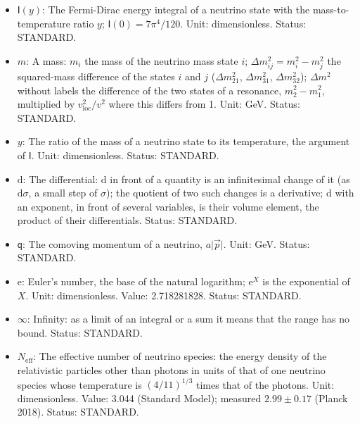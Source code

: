 \documentclass[
  10pt,
]{article}
\begin{document}
\begin{itemize}
  \(\mathsf{T}_\gamma^{(0)}\) its value today. Unit: GeV (or K). Value:
  2.7255 K today. Status: STANDARD.
\item
  \(\mathsf{I}(y)\): The Fermi-Dirac energy integral of a neutrino state
  with the mass-to-temperature ratio \(y\);
  \(\mathsf{I}(0) = 7\pi^4/120\). Unit: dimensionless. Status: STANDARD.
\item
  \(m\): A mass: \(m_i\) the mass of the neutrino mass state \(i\);
  \(\Delta m_{ij}^2 = m_i^2 - m_j^2\) the squared-mass difference of the
  states \(i\) and \(j\) (\(\Delta m_{21}^2\), \(\Delta m_{31}^2\),
  \(\Delta m_{32}^2\)); \(\Delta m^2\) without labels the difference of
  the two states of a resonance, \(m_2^2 - m_1^2\), multiplied by
  \(v_{\mathrm{loc}}^2/v^2\) where this differs from 1. Unit: GeV.
  Status: STANDARD.
\item
  \(y\): The ratio of the mass of a neutrino state to its temperature,
  the argument of \(\mathsf{I}\). Unit: dimensionless. Status: STANDARD.
\item
  \(\mathrm{d}\): The differential: \(\mathrm{d}\) in front of a
  quantity is an infinitesimal change of it (as \(\mathrm{d}\sigma\), a
  small step of \(\sigma\)); the quotient of two such changes is a
  derivative; \(\mathrm{d}\) with an exponent, in front of several
  variables, is their volume element, the product of their
  differentials. Status: STANDARD.
\item
  \(\mathsf{q}\): The comoving momentum of a neutrino,
  \(a\lvert\vec p\rvert\). Unit: GeV. Status: STANDARD.
\item
  \(\mathrm{e}\): Euler's number, the base of the natural logarithm;
  \(\mathrm{e}^{X}\) is the exponential of \(X\). Unit: dimensionless.
  Value: 2.718281828. Status: STANDARD.
\item
  \(\infty\): Infinity: as a limit of an integral or a sum it means that
  the range has no bound. Status: STANDARD.
\item
  \(N_{\mathrm{eff}}\): The effective number of neutrino species: the
  energy density of the relativistic particles other than photons in
  units of that of one neutrino species whose temperature is
  \((4/11)^{1/3}\) times that of the photons. Unit: dimensionless.
  Value: 3.044 (Standard Model); measured \(2.99 \pm 0.17\) (Planck
  2018). Status: STANDARD.
\end{itemize}
\end{document}
